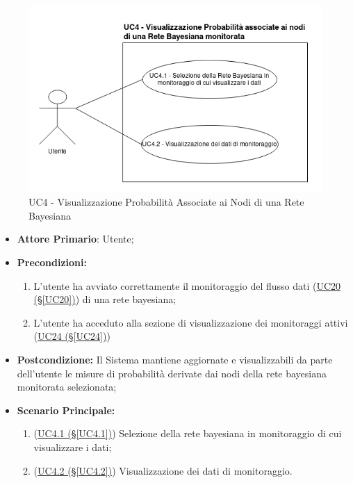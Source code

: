 \begin{figure}[H]
	\begin{center}
		\includegraphics[scale=0.6]{./images/UC4.png}
		 \caption{UC4 - Visualizzazione Probabilità Associate ai Nodi di una Rete Bayesiana}
	\end{center}
\end{figure}

\begin{itemize}
	\item \textbf{Attore Primario}: Utente;
	\item \textbf{Precondizioni:}
	\begin{enumerate}
		\item L'utente ha avviato correttamente il monitoraggio del flusso dati (\hyperref[UC20]{UC20 (§\ref*{UC20})}) di una rete bayesiana;
		\item L'utente ha acceduto alla sezione di visualizzazione dei monitoraggi attivi (\hyperref[UC24]{UC24 (§\ref*{UC24})})
	\end{enumerate}	 
	\item \textbf{Postcondizione:} Il Sistema mantiene aggiornate e visualizzabili da parte dell'utente le misure di probabilità derivate dai nodi della rete bayesiana monitorata selezionata;
	\item \textbf{Scenario Principale:} 
	\begin{enumerate}
		\item (\hyperref[UC4.1]{UC4.1 (§\ref*{UC4.1})}) Selezione della rete bayesiana in monitoraggio di cui visualizzare i dati;
		\item (\hyperref[UC4.2]{UC4.2 (§\ref*{UC4.2})}) Visualizzazione dei dati di monitoraggio.
	\end{enumerate}
\end{itemize}


